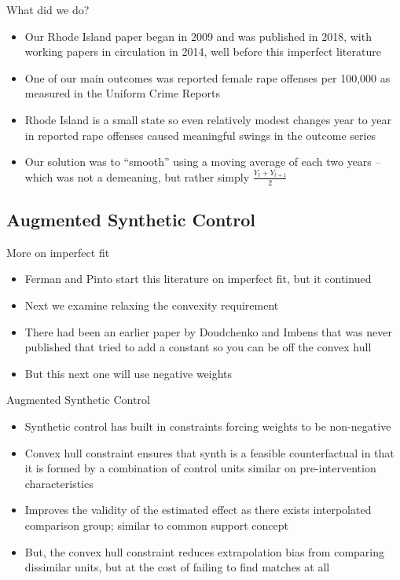 \documentclass{beamer}
\begin{document}
\begin{frame}{What did we do?}

\begin{itemize}
\item Our Rhode Island paper began in 2009 and was published in 2018, with working papers in circulation in 2014, well before this imperfect literature
\item One of our main outcomes was reported female rape offenses per 100,000 as measured in the Uniform Crime Reports 
\item Rhode Island is a small state so even relatively modest changes year to year in reported rape offenses caused meaningful swings in the outcome series
\item Our solution was to ``smooth'' using a moving average of each two years -- which was not a demeaning, but rather simply $\frac{Y_t + Y_{t+1}}{2}$
\end{itemize}

\end{frame}





\subsection{Augmented Synthetic Control}

\begin{frame}{More on imperfect fit}

\begin{itemize}
\item Ferman and Pinto start this literature on imperfect fit, but it continued
\item Next we examine relaxing the convexity requirement
\item There had been an earlier paper by Doudchenko and Imbens that was never published that tried to add a constant so you can be off the convex hull
\item But this next one will use negative weights
\end{itemize}

\end{frame}

\begin{frame}{Augmented Synthetic Control}
\begin{itemize}
\item Synthetic control has built in constraints forcing weights to be non-negative
\item Convex hull constraint ensures that synth is a feasible counterfactual in that it is formed by a combination of control units similar on pre-intervention characteristics
\item Improves the validity of the estimated effect as there exists interpolated comparison group; similar to common support concept
\item But, the convex hull constraint reduces extrapolation bias from comparing dissimilar units, but at the cost of failing to find matches at all
\end{itemize}

\end{frame}
\end{document}
